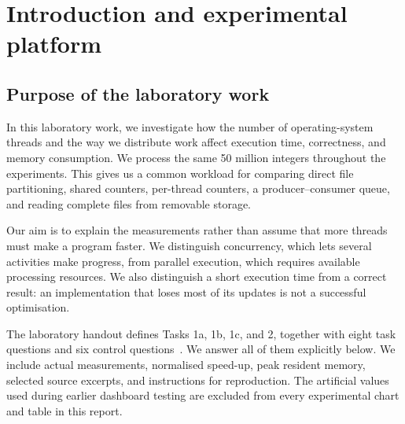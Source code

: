 \chapter{Introduction and experimental platform}
\section{Purpose of the laboratory work}
In this laboratory work, we investigate how the number of operating-system threads and the way we distribute work affect execution time, correctness, and memory consumption. We process the same 50 million integers throughout the experiments. This gives us a common workload for comparing direct file partitioning, shared counters, per-thread counters, a producer--consumer queue, and reading complete files from removable storage.

Our aim is to explain the measurements rather than assume that more threads must make a program faster. We distinguish concurrency, which lets several activities make progress, from parallel execution, which requires available processing resources. We also distinguish a short execution time from a correct result: an implementation that loses most of its updates is not a successful optimisation.

The laboratory handout defines Tasks 1a, 1b, 1c, and 2, together with eight task questions and six control questions~\cite{lab}. We answer all of them explicitly below. We include actual measurements, normalised speed-up, peak resident memory, selected source excerpts, and instructions for reproduction. The artificial values used during earlier dashboard testing are excluded from every experimental chart and table in this report.

